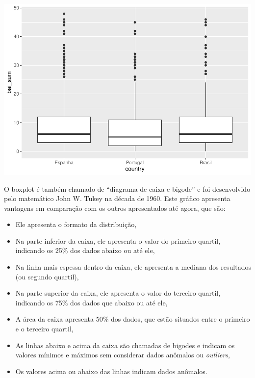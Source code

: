 \documentclass[
]{book}
\providecommand{\tightlist}{%
  \setlength{\itemsep}{0pt}\setlength{\parskip}{0pt}}
\begin{document}
\begin{center}\includegraphics{gitbook-demo_files/figure-latex/unnamed-chunk-21-1} \end{center}

O boxplot é também chamado de ``diagrama de caixa e bigode'' e foi desenvolvido pelo matemático John W. Tukey na década de 1960. Este gráfico apresenta vantagens em comparação com os outros apresentados até agora, que são:

\begin{itemize}
\tightlist
\item
  Ele apresenta o formato da distribuição,\\
\item
  Na parte inferior da caixa, ele apresenta o valor do primeiro quartil, indicando os 25\% dos dados abaixo ou até ele,\\
\item
  Na linha mais espessa dentro da caixa, ele apresenta a mediana dos resultados (ou segundo quartil),\\
\item
  Na parte superior da caixa, ele apresenta o valor do terceiro quartil, indicando os 75\% dos dados que abaixo ou até ele,\\
\item
  A área da caixa apresenta 50\% dos dados, que estão situados entre o primeiro e o terceiro quartil,\\
\item
  As linhas abaixo e acima da caixa são chamadas de bigodes e indicam os valores mínimos e máximos sem considerar dados anômalos ou \emph{outliers},\\
\item
  Os valores acima ou abaixo das linhas indicam dados anômalos.
\end{itemize}
\end{document}
